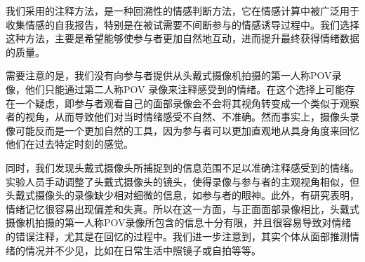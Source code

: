 我们采用的注释方法，是一种回溯性的情感判断方法，它在情感计算中被广泛用于收集情感的自我报告，特别是在被试需要不间断参与的情感诱导过程中。我们选择这种方法，主要是希望能够使参与者更加自然地互动，进而提升最终获得情绪数据的质量。

需要注意的是，我们没有向参与者提供从头戴式摄像机拍摄的第一人称POV录像，他们只能通过第二人称POV 录像来注释感受到的情绪。在这个选择上可能存在一个疑虑，即参与者观看自己的面部录像会不会将其视角转变成一个类似于观察者的视角，从而导致他们对当时情绪感受不自然、不准确。然而事实上，摄像头录像可能反而是一个更加自然的工具，因为参与者可以更加直观地从具身角度来回忆他们在过去特定时刻的感觉。

同时，我们发现头戴式摄像头所捕捉到的信息范围不足以准确注释感受到的情绪。实验人员手动调整了头戴式摄像头的镜头，使得录像与参与者的主观视角相似，但头戴式摄像头的录像缺少相对细微的信息，如参与者的眼神。此外，有研究表明，情绪记忆很容易出现偏差和失真。所以在这一方面，与正面面部录像相比，头戴式摄像机拍摄的第一人称POV录像所包含的信息十分有限，并且很容易导致对情绪的错误注释，尤其是在回忆的过程中。我们进一步注意到，其实个体从面部推测情绪的情况并不少见，比如在日常生活中照镜子或自拍等等。

